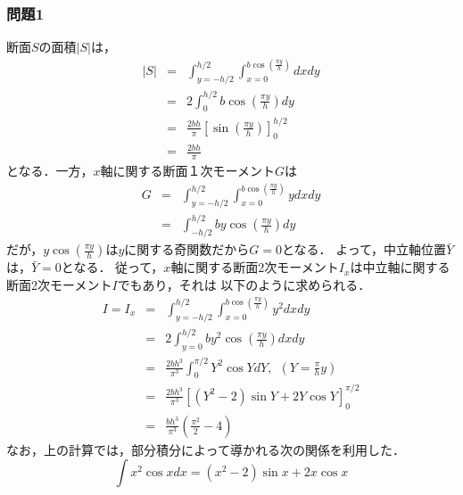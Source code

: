 \documentclass[10pt,a4j]{jarticle}
\begin{document}
\subsubsection*{問題1}
断面$S$の面積$\left| S \right|$は， 
\begin{eqnarray}
	\left| S\right| &= & 
	\int _{y=-h/2}^{h/2}\int _{x=0}^{b\cos\left(\frac{\pi y}{h}\right) } dxdy
	\nonumber
	\\
	&=& 
	2\int_{0}^{h/2} b\cos \left( \frac{\pi y}{h}\right) dy 
	\nonumber
	\\
	&=& 
	\frac{2bh}{\pi}\left[ \sin \left( \frac{\pi y}{h} \right)\right]_0^{h/2}
	\nonumber
	\\
	&=&
	\frac{2bh}{\pi}
\end{eqnarray}
となる．一方，$x$軸に関する断面１次モーメント$G$は
\begin{eqnarray}
	G &=& 
	\int _{y=-h/2}^{h/2}\int_{x=0}^{b\cos\left(\frac{\pi y}{h}\right) } ydxdy \\
	 &=& 
	\int_{-h/2}^{h/2} by\cos \left( \frac{\pi y}{h}\right) dy 
\end{eqnarray}
だが，$y\cos\left(\frac{\pi y}{h}\right)$は$y$に関する奇関数だから$G=0$となる．
よって，中立軸位置$\bar Y$は，$\bar Y=0$となる．
従って，$x$軸に関する断面2次モーメント$I_x$は中立軸に関する断面2次モーメント$I$でもあり，それは
以下のように求められる．
\begin{eqnarray}
	I=I_x &= & 
	\int _{y=-h/2}^{h/2} \int _{x=0}^{b\cos \left(\frac{\pi y }{h}\right)} y^2dxdy   
	\nonumber \\
	&=& 
	2\int _{y=0}^{h/2} b y^2\cos \left(\frac{\pi y }{h}\right) dxdy   
	\nonumber \\
	&=& 
	\frac{2bh^3}{\pi^3}\int_0^{\pi/2}	
	Y^2 \cos Y dY, \ \ \left(Y=\frac{\pi}{h}y\right)
	\nonumber \\
	&=& 
	\frac{2bh^3}{\pi^3}
	\left[ \left(Y^2-2\right)\sin Y +2 Y\cos Y \right]_{0}^{\pi/2}
	\nonumber \\
	&=& 
	\frac{bh^3}{\pi^3}\left( \frac{\pi^2}{2}-4 \right)
\end{eqnarray}
なお，上の計算では，部分積分によって導かれる次の関係を利用した．
\begin{equation}
	\int x^2 \cos x dx = (x^2-2)\sin x +2x\cos x
	\label{eqn:int_idt}
\end{equation}
\end{document}
